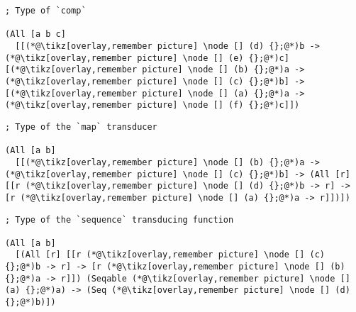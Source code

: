 \documentclass[9pt]{extarticle}
\begin{document}
\begin{lstlisting}
; Type of `comp`

(All [a b c]
  [[(*@\tikz[overlay,remember picture] \node [] (d) {};@*)b -> (*@\tikz[overlay,remember picture] \node [] (e) {};@*)c] [(*@\tikz[overlay,remember picture] \node [] (b) {};@*)a -> (*@\tikz[overlay,remember picture] \node [] (c) {};@*)b] -> [(*@\tikz[overlay,remember picture] \node [] (a) {};@*)a -> (*@\tikz[overlay,remember picture] \node [] (f) {};@*)c]])
\end{lstlisting}

\begin{lstlisting}
; Type of the `map` transducer

(All [a b]
  [[(*@\tikz[overlay,remember picture] \node [] (b) {};@*)a -> (*@\tikz[overlay,remember picture] \node [] (c) {};@*)b] -> (All [r] [[r (*@\tikz[overlay,remember picture] \node [] (d) {};@*)b -> r] -> [r (*@\tikz[overlay,remember picture] \node [] (a) {};@*)a -> r]])])
\end{lstlisting}

\begin{lstlisting}
; Type of the `sequence` transducing function

(All [a b]
  [(All [r] [[r (*@\tikz[overlay,remember picture] \node [] (c) {};@*)b -> r] -> [r (*@\tikz[overlay,remember picture] \node [] (b) {};@*)a -> r]]) (Seqable (*@\tikz[overlay,remember picture] \node [] (a) {};@*)a) -> (Seq (*@\tikz[overlay,remember picture] \node [] (d) {};@*)b)])
\end{lstlisting}
\end{document}
